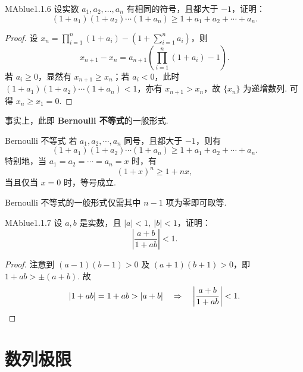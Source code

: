 \begin{problem}{MAblue}{1.1.6}
    设实数 $a_1, a_2, \ldots, a_n$ 有相同的符号，且都大于 $-1$，证明：
    \[
        (1+a_1)(1+a_2) \cdots (1+a_n) \geqslant 1 + a_1 + a_2 + \cdots + a_n.
    \]
\end{problem}

\begin{proof}
    设 $x_n = \prod_{i=1}^n (1 + a_i) - (1 + \sum_{i=1}^n a_i)$，则
    \[
        x_{n+1} - x_n = a_{n+1} \left( \prod_{i=1}^n (1 + a_i) - 1 \right).
    \]
    若 $a_i \geqslant 0$，显然有 $x_{n+1} \geqslant x_n$；若 $a_i < 0$，此时 $(1+a_1)(1+a_2)\cdots(1+a_n) < 1$，亦有 $x_{n+1} > x_n$，故 $\{ x_n \}$ 为递增数列. 可得 $x_n \geqslant x_1 = 0$.
\end{proof}

事实上，此即 \textbf{Bernoulli 不等式}的一般形式.
\begin{center}
    \begin{minipage}{0.85\textwidth}
        \begin{theorem}{Bernoulli 不等式}{}
            若 $a_1, a_2, \cdots, a_n$ 同号，且都大于 $-1$，则有
            \[
                (1 + a_1)(1 + a_2) \cdots (1 + a_n) \geqslant 1 + a_1 + a_2 + \cdots + a_n.
            \]
            特别地，当 $a_1 = a_2 = \cdots = a_n = x$ 时，有
            \[
                (1 + x)^n \geqslant 1 + nx,
            \]
            当且仅当 $x = 0$ 时，等号成立.
        \end{theorem}
    \end{minipage}
\end{center}

\begin{mmark}
    Bernoulli 不等式的一般形式仅需其中 $n-1$ 项为零即可取等.
\end{mmark}

\begin{problem}{MAblue}{1.1.7}
    设 $a, b$ 是实数，且 $|a| < 1,\ |b| < 1$，证明：
    \[
        \left| \frac{a+b}{1+ab} \right| < 1.
    \]
\end{problem}

\begin{proof}
    注意到 $(a-1)(b-1) > 0$ 及 $(a+1)(b+1) > 0$，即 $1+ab > \pm(a+b)$. 故
    \[
        |1+ab| = 1+ab > |a+b| \quad \Rightarrow \quad \left| \frac{a+b}{1+ab} \right| < 1. \qedhere
    \]
\end{proof}

\section{数列极限}

